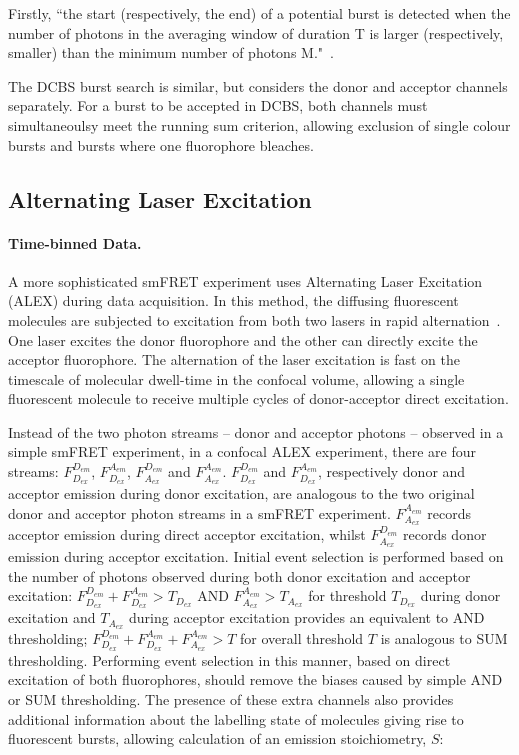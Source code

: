 Firstly, ``the start (respectively, the end) of a potential burst is detected when the number of photons in the averaging window of duration T is larger (respectively, smaller) than the minimum number of photons M."~\cite{nir06}.

The DCBS burst search is similar, but considers the donor and acceptor channels separately. For a burst to be accepted in DCBS, both channels must simultaneoulsy meet the running sum criterion, allowing exclusion of single colour bursts and bursts where one fluorophore bleaches.

\subsection{Alternating Laser Excitation}
\paragraph{Time-binned Data.}
A more sophisticated smFRET experiment uses Alternating Laser Excitation (ALEX) during data acquisition. In this method, the diffusing fluorescent molecules are subjected to excitation from both two lasers in rapid alternation~\cite{kapanidis05}. One laser excites the donor fluorophore and the other can directly excite the acceptor fluorophore. The alternation of the laser excitation is fast on the timescale of molecular dwell-time in the confocal volume, allowing a single fluorescent molecule to receive multiple cycles of donor-acceptor direct excitation.

Instead of the two photon streams -- donor and acceptor photons -- observed in a simple smFRET experiment, in a confocal ALEX experiment, there are four streams: $F_{D_{ex}}^{D_{em}}$, $F_{D_{ex}}^{A_{em}}$, $F_{A_{ex}}^{D_{em}}$ and $F_{A_{ex}}^{A_{em}}$. $F_{D_{ex}}^{D_{em}}$ and $F_{D_{ex}}^{A_{em}}$, respectively donor and acceptor emission during donor excitation, are analogous to the two original donor and acceptor photon streams in a smFRET experiment. $F_{A_{ex}}^{A_{em}}$ records acceptor emission during direct acceptor excitation, whilst $F_{A_{ex}}^{D_{em}}$ records donor emission during acceptor excitation. Initial event selection is performed based on the number of photons observed during both donor excitation and acceptor excitation: $F_{D_{ex}}^{D_{em}} + F_{D_{ex}}^{A_{em}} > T_{D_{ex}}$ AND $F_{A_{ex}}^{A_{em}} > T_{A_{ex}}$ for threshold $T_{D_{ex}}$ during donor excitation and $T_{A_{ex}}$ during acceptor excitation provides an equivalent to AND thresholding; $F_{D_{ex}}^{D_{em}} + F_{D_{ex}}^{A_{em}} + F_{A_{ex}}^{A_{em}} > T$ for overall threshold $T$ is analogous to SUM thresholding. Performing event selection in this manner, based on direct excitation of both fluorophores, should remove the biases caused by simple AND or SUM thresholding. The presence of these extra channels also provides additional information about the labelling state of molecules giving rise to fluorescent bursts, allowing calculation of an emission stoichiometry, $S$:

